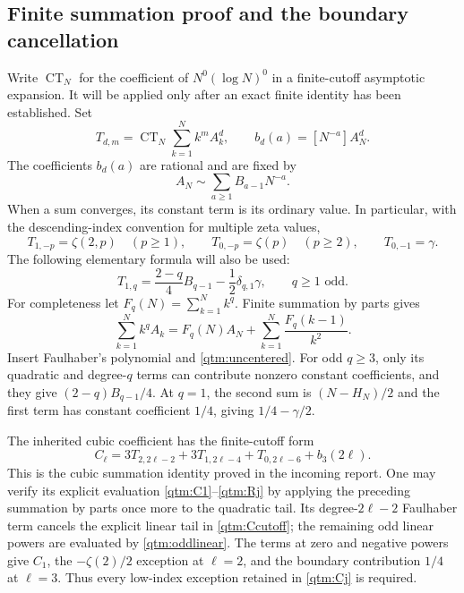 \subsection{Finite summation proof and the boundary cancellation}

Write $\operatorname{CT}_N$ for the coefficient of
$N^0(\log N)^0$ in a finite-cutoff asymptotic expansion.  It will be
applied only after an exact finite identity has been established.
Set
\begin{equation}\label{qtm:T}
 T_{d,m}=\operatorname{CT}_N\sum_{k=1}^Nk^m A_k^d,
 \qquad b_d(a)=[N^{-a}]A_N^d.
\end{equation}
The coefficients $b_d(a)$ are rational and are fixed by
\begin{equation}\label{qtm:uncentered}
 A_N\sim\sum_{a\ge1}B_{a-1}N^{-a}.
\end{equation}
When a sum converges, its constant term is its ordinary value.  In
particular, with the descending-index convention for multiple zeta values,
\begin{equation}\label{qtm:linearnegative}
 T_{1,-p}=\zeta(2,p)\quad(p\ge1),\qquad
 T_{0,-p}=\zeta(p)\quad(p\ge2),\qquad T_{0,-1}=\gamma.
\end{equation}
The following elementary formula will also be used:
\begin{equation}\label{qtm:oddlinear}
 T_{1,q}=\frac{2-q}{4}B_{q-1}-\frac12\delta_{q,1}\gamma,
 \qquad q\ge1\text{ odd}.
\end{equation}
For completeness let $F_q(N)=\sum_{k=1}^Nk^q$.  Finite summation by
parts gives
\[
 \sum_{k=1}^Nk^qA_k
   =F_q(N)A_N+\sum_{k=1}^N\frac{F_q(k-1)}{k^2}.
\]
Insert Faulhaber's polynomial and \eqref{qtm:uncentered}.  For odd
$q\ge3$, only its quadratic and degree-$q$ terms can contribute
nonzero constant coefficients, and they give $(2-q)B_{q-1}/4$.
At $q=1$, the second sum is $(N-H_N)/2$ and the first term has
constant coefficient $1/4$, giving $1/4-\gamma/2$.

The inherited cubic coefficient has the finite-cutoff form
\begin{equation}\label{qtm:Ccutoff}
 C_\ell=3T_{2,2\ell-2}+3T_{1,2\ell-4}
          +T_{0,2\ell-6}+b_3(2\ell).
\end{equation}
This is the cubic summation identity proved in the incoming report.
One may verify its explicit evaluation
\eqref{qtm:C1}--\eqref{qtm:Rj} by applying the preceding summation
by parts once more to the quadratic tail.  Its degree-$2\ell-2$
Faulhaber term cancels the explicit linear tail in
\eqref{qtm:Ccutoff}; the remaining odd linear powers are evaluated
by \eqref{qtm:oddlinear}.  The terms at zero and negative powers
give $C_1$, the $-\zeta(2)/2$ exception at $\ell=2$, and the
boundary contribution $1/4$ at $\ell=3$.  Thus every low-index
exception retained in \eqref{qtm:Cj} is required.

